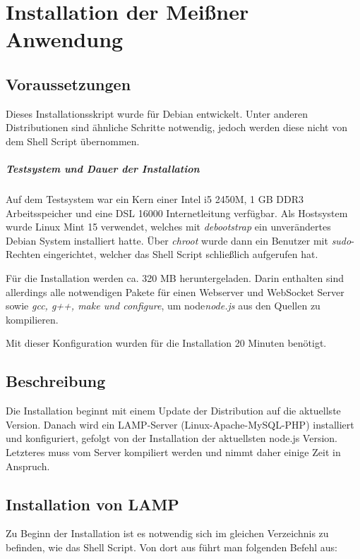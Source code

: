 \chapter{Installation der Meißner Anwendung}
\section{Voraussetzungen}
Dieses Installationsskript wurde für Debian entwickelt. Unter anderen Distributionen sind ähnliche Schritte notwendig, jedoch werden diese nicht von dem Shell Script übernommen.

\paragraph{Testsystem und Dauer der Installation}
Auf dem Testsystem war ein Kern einer Intel i5 2450M, 1 GB DDR3 Arbeitsspeicher und eine DSL 16000 Internetleitung verfügbar. Als Hostsystem wurde Linux Mint 15 verwendet, welches mit \emph{debootstrap} ein unverändertes Debian System installiert hatte. Über \emph{chroot} wurde dann ein Benutzer mit \emph{sudo}-Rechten eingerichtet, welcher das Shell Script schließlich aufgerufen hat.\par 

Für die Installation werden ca. 320 MB heruntergeladen. Darin enthalten sind allerdings alle notwendigen Pakete für einen Webserver und WebSocket Server sowie \emph{gcc, g++, make und configure}, um node\emph{node.js} aus den Quellen zu kompilieren.\par

Mit dieser Konfiguration wurden für die Installation 20 Minuten benötigt.

\section{Beschreibung}
Die Installation beginnt mit einem Update der Distribution auf die aktuellste Version. Danach wird ein LAMP-Server (Linux-Apache-MySQL-PHP) installiert und konfiguriert, gefolgt von der Installation der aktuellsten node.js Version. Letzteres muss vom Server kompiliert werden und nimmt daher einige Zeit in Anspruch.

\section{Installation von LAMP}
Zu Beginn der Installation ist es notwendig sich im gleichen Verzeichnis zu befinden, wie das Shell Script. Von dort aus führt man folgenden Befehl aus:

